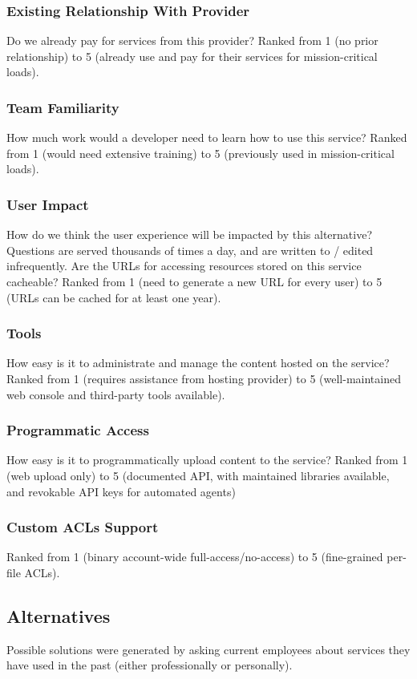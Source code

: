 \documentclass[se]{uw-wkrpt}
\begin{document}
\subsubsection{Existing Relationship With Provider}
Do we already pay for services from this provider? Ranked from 1 (no prior 
relationship) to 5 (already use and pay for their services for mission-critical 
loads).

\subsubsection{Team Familiarity}
How much work would a developer need to learn how to use this service? Ranked 
from 1 (would need extensive training) to 5 (previously used in 
mission-critical loads).

\subsubsection{User Impact}
How do we think the user experience will be impacted by this alternative?
Questions are served thousands of times a day, and are written to / edited 
infrequently. Are the URLs for accessing resources stored on this service 
cacheable? Ranked from 1 (need to generate a new URL for every user) to 5 (URLs 
can be cached for at least one year).

\subsubsection{Tools}
How easy is it to administrate and manage the content hosted on the service?  
Ranked from 1 (requires assistance from hosting provider) to 5 (well-maintained 
web console and third-party tools available).

\subsubsection{Programmatic Access}
How easy is it to programmatically upload content to the service?
Ranked from 1 (web upload only) to 5 (documented API, with maintained libraries 
available, and revokable API keys for automated agents)

\subsubsection{Custom ACLs Support}
Ranked from 1 (binary account-wide full-access/no-access) to 5 (fine-grained 
per-file ACLs).

\subsection{Alternatives}
Possible solutions were generated by asking current employees about services 
they have used in the past (either professionally or personally).
\end{document}
